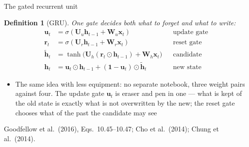 \documentclass[aspectratio=169, 11pt]{beamer}
\newtheorem{defx}[theorem]{Definition}
\newcommand{\srcline}[1]{%
  \par\vspace{0.25em}%
  {\scriptsize\color{mcMuted}\hfill #1\par}}
\newcommand{\src}[3]{}      %
\begin{document}
\begin{frame}{The gated recurrent unit}
  \src{goodfellow2016}{equation}{10.45-10.47}
  \src{goodfellow2016}{section}{10.10.2}
  \src{cho2014}{equation}{5-8}
  \src{cho2014}{section}{2.3}
  \src{chung2014}{section}{3.2}
  \vspace{-0.45em}
  \begin{defx}[GRU]\label{th:gru}
    \small
    One gate decides both what to forget and what to write:
    \[
      \begin{aligned}
        \mathbf{u}_t &= \sigma(\mathbf{U}_u\mathbf{h}_{t-1} + \mathbf{W}_u\mathbf{x}_t) &&\text{update gate}\\
        \mathbf{r}_t &= \sigma(\mathbf{U}_r\mathbf{h}_{t-1} + \mathbf{W}_r\mathbf{x}_t) &&\text{reset gate}\\
        \tilde{\mathbf{h}}_t &= \tanh\big(\mathbf{U}_h(\mathbf{r}_t \odot \mathbf{h}_{t-1}) + \mathbf{W}_h\mathbf{x}_t\big) &&\text{candidate}\\
        \mathbf{h}_t &= \mathbf{u}_t \odot \mathbf{h}_{t-1} + (\mathbf{1} - \mathbf{u}_t) \odot \tilde{\mathbf{h}}_t &&\text{new state}
      \end{aligned}
    \]
  \end{defx}
  \vspace{-0.15em}
  {\footnotesize
  \begin{itemize}\itemsep0.12em
    \item The same idea with less equipment: no separate notebook,
          three weight pairs against four. The update gate $\mathbf{u}_t$
          is eraser and pen in one --- what is kept of the old state is
          exactly what is not overwritten by the new; the reset gate
          chooses what of the past the candidate may see
  \end{itemize}}
  \vspace{-0.3em}
  \srcline{Goodfellow et al.\ (2016), Eqs.~10.45--10.47; Cho et al.\ (2014); Chung et al.\ (2014).}
\end{frame}
\end{document}
